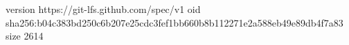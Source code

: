 version https://git-lfs.github.com/spec/v1
oid sha256:b04c383bd250c6b207e25cdc3fef1bb660b8b112271e2a588eb49e89db4f7a83
size 2614
